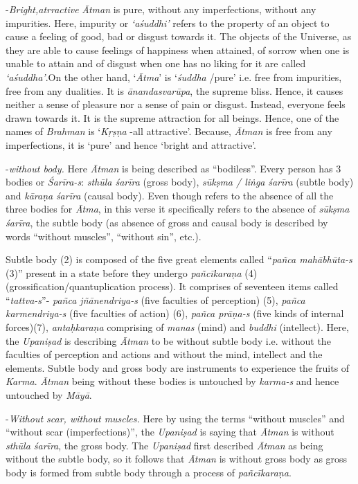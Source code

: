 -\emph{Bright,atrractive} \emph{Ātman} is pure, without any imperfections, without any impurities. Here, impurity or \emph{`aśuddhi'} refers to the property of an object to cause a feeling of good, bad or disgust towards it. The objects of the Universe, as they are able to cause feelings of happiness when attained, of sorrow when one is unable to attain and of disgust when one has no liking for it are called \emph{`aśuddha'}.On the other hand, `\emph{Ātma}' is `\emph{śuddha} /pure' i.e. free from impurities, free from any dualities. It is \emph{ānandasvarūpa}, the supreme bliss. Hence, it causes neither a sense of pleasure nor a sense of pain or disgust. Instead, everyone feels drawn towards it. It is the supreme attraction for all beings. Hence, one of the names of \emph{Brahman} is `\emph{Kṛṣṇa} -all attractive'. Because, \emph{Ātman} is free from any imperfections, it is `pure' and hence `bright and attractive'.
\vskip 1.5pt

-\emph{without body.} Here \emph{Ātman} is being described as ``bodiless''. Every person has 3 bodies or \emph{Śarīra-s}: \emph{sthūla śarīra} (gross body), \emph{sūkṣma / liṅga} \emph{śarīra} (subtle body) and \emph{kāraṇa} \emph{śarīra} (causal body). Even though  refers to the absence of all the three bodies for \emph{Ātma}, in this verse it specifically refers to the absence of \emph{sūkṣma śarīra}, the subtle body (as absence of gross and causal body is described by words ``without muscles'', ``without sin'', etc.).
\vskip 1.5pt

Subtle body (2) is composed of the five great elements called ``\emph{pañca mahābhūta-s} (3)'' present in a state before they undergo \emph{pañcīkaraṇa} (4) (grossification/quantuplication process). It comprises of seventeen items called ``\emph{tattva-s}''- \emph{pañca jñānendriya-s} (five faculties of perception) (5), \emph{pañca karmendriya-s} (five faculties of action) (6), \emph{pañca prāṇa-s} (five kinds of internal forces)(7), \emph{antaḥkaraṇa} comprising of \emph{manas} (mind) and \emph{buddhi} (intellect). Here, the \emph{Upaniṣad} is describing \emph{Ātman} to be without subtle body i.e. without the faculties of perception and actions and without the mind, intellect and the elements. Subtle body and gross body are instruments to experience the fruits of \emph{Karma}. \emph{Ātman} being without these bodies is untouched by \emph{karma-s} and hence untouched by \emph{Māyā}.
\vskip 1.5pt

-\emph{Without scar, without muscles.} Here by using the terms ``without muscles'' and ``without scar (imperfections)'', the \emph{Upaniṣad} is saying that \emph{Ātman} is without \emph{sthūla śarīra}, the gross body. The \emph{Upaniṣad} first described \emph{Ātman} as being without the subtle body, so it follows that \emph{Ātman} is without gross body as gross body is formed from subtle body through a process of \emph{pañcīkaraṇa}.

